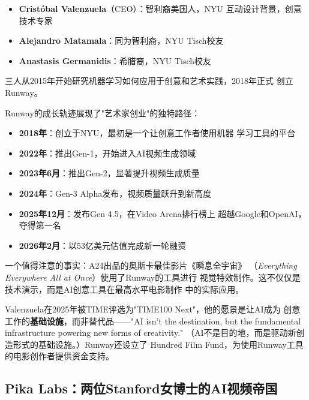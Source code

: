 \begin{corebox}[Runway的三位创始人]
\begin{itemize}
  \item \textbf{Cristóbal Valenzuela}（CEO）：智利裔美国人，NYU
    互动设计背景，创意技术专家
  \item \textbf{Alejandro Matamala}：同为智利裔，NYU Tisch校友
  \item \textbf{Anastasis Germanidis}：希腊裔，NYU Tisch校友
\end{itemize}
三人从2015年开始研究机器学习如何应用于创意和艺术实践，2018年正式
创立Runway。
\end{corebox}

Runway的成长轨迹展现了"艺术家创业"的独特路径：

\begin{itemize}
  \item \textbf{2018年}：创立于NYU，最初是一个让创意工作者使用机器
    学习工具的平台
  \item \textbf{2022年}：推出Gen-1，开始进入AI视频生成领域
  \item \textbf{2023年6月}：推出Gen-2，显著提升视频生成质量
  \item \textbf{2024年}：Gen-3 Alpha发布，视频质量跃升到新高度
  \item \textbf{2025年12月}：发布Gen 4.5，在Video Arena排行榜上
    超越Google和OpenAI，夺得第一名
  \item \textbf{2026年2月}：以53亿美元估值完成新一轮融资
\end{itemize}

一个值得注意的事实：A24出品的奥斯卡最佳影片《瞬息全宇宙》
（\textit{Everything Everywhere All at Once}）使用了Runway的工具进行
视觉特效制作。这不仅仅是技术演示，而是AI创意工具在最高水平电影制作
中的实际应用。

Valenzuela在2025年被TIME评选为"TIME100 Next"，他的愿景是让AI成为
创意工作的\textbf{基础设施}，而非替代品——"AI isn't the destination,
but the fundamental infrastructure powering new forms of creativity."
（AI不是目的地，而是驱动新创造形式的基础设施。）Runway还设立了
Hundred Film Fund，为使用Runway工具的电影创作者提供资金支持。

\subsection{Pika Labs：两位Stanford女博士的AI视频帝国}
\label{subsec:founders-pika}

